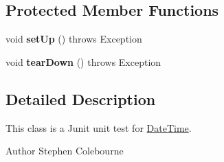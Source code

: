 \subsection*{Protected Member Functions}
\begin{DoxyCompactItemize}
\item 
\hypertarget{classorg_1_1joda_1_1time_1_1_test_date_time___constructors_ad538417488793bf16eab16b45d81c460}{void {\bfseries set\-Up} ()  throws Exception }\label{classorg_1_1joda_1_1time_1_1_test_date_time___constructors_ad538417488793bf16eab16b45d81c460}

\item 
\hypertarget{classorg_1_1joda_1_1time_1_1_test_date_time___constructors_a4c4357d782d5616183d6dc751d2cf1c7}{void {\bfseries tear\-Down} ()  throws Exception }\label{classorg_1_1joda_1_1time_1_1_test_date_time___constructors_a4c4357d782d5616183d6dc751d2cf1c7}

\end{DoxyCompactItemize}


\subsection{Detailed Description}
This class is a Junit unit test for \hyperlink{classorg_1_1joda_1_1time_1_1_date_time}{Date\-Time}.

\begin{DoxyAuthor}{Author}
Stephen Colebourne 
\end{DoxyAuthor}


